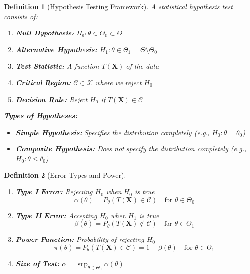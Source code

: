 \documentclass[12pt,a4paper]{article}
\newtheorem{definition}{Definition}[section]
\theoremstyle{remark}
\begin{document}
\begin{definition}[Hypothesis Testing Framework]
A statistical hypothesis test consists of:
\begin{enumerate}
\item \textbf{Null Hypothesis:} $H_0: \theta \in \Theta_0 \subset \Theta$
\item \textbf{Alternative Hypothesis:} $H_1: \theta \in \Theta_1 = \Theta \setminus \Theta_0$
\item \textbf{Test Statistic:} A function $T(\mathbf{X})$ of the data
\item \textbf{Critical Region:} $\mathcal{C} \subset \mathcal{X}$ where we reject $H_0$
\item \textbf{Decision Rule:} Reject $H_0$ if $T(\mathbf{X}) \in \mathcal{C}$
\end{enumerate}

\textbf{Types of Hypotheses:}
\begin{itemize}
\item \textbf{Simple Hypothesis:} Specifies the distribution completely (e.g., $H_0: \theta = \theta_0$)
\item \textbf{Composite Hypothesis:} Does not specify the distribution completely (e.g., $H_0: \theta \leq \theta_0$)
\end{itemize}
\end{definition}

\begin{definition}[Error Types and Power]
\begin{enumerate}
\item \textbf{Type I Error:} Rejecting $H_0$ when $H_0$ is true
   $$\alpha(\theta) = P_\theta(T(\mathbf{X}) \in \mathcal{C}) \quad \text{for } \theta \in \Theta_0$$
\item \textbf{Type II Error:} Accepting $H_0$ when $H_1$ is true
   $$\beta(\theta) = P_\theta(T(\mathbf{X}) \notin \mathcal{C}) \quad \text{for } \theta \in \Theta_1$$
\item \textbf{Power Function:} Probability of rejecting $H_0$
   $$\pi(\theta) = P_\theta(T(\mathbf{X}) \in \mathcal{C}) = 1 - \beta(\theta) \quad \text{for } \theta \in \Theta_1$$
\item \textbf{Size of Test:} $\alpha = \sup_{\theta \in \Theta_0} \alpha(\theta)$
\end{enumerate}
\end{definition}
\end{document}
